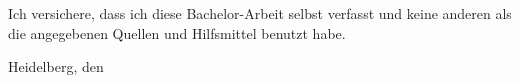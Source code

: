 \chapter*{}

\begin{german}\setlength\parindent{0em}
    Ich versichere, dass ich diese Bachelor-Arbeit selbst verfasst
    und keine anderen als die angegebenen Quellen und Hilfsmittel benutzt habe.

    \vspace{5em}

    Heidelberg, den 
    \hspace{3em}\hrulefill
\end{german}